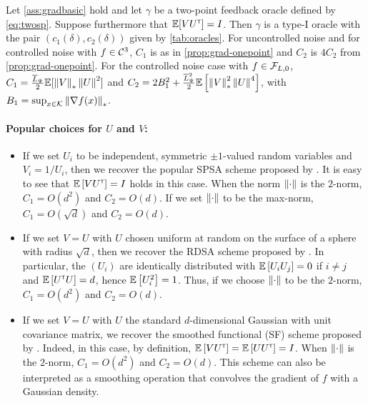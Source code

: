 \begin{proposition}
\label{prop:grad-spsa}
Let \cref{ass:gradbasic} hold and let $\gamma$  be a two-point feedback oracle defined by \eqref{eq:twosp}.
Suppose furthermore that $\mathbb{E}[V U^\mathsf{\scriptscriptstyle T}] = I$.
Then $\gamma$ is a type-I oracle with the pair $(c_1(\delta),c_2(\delta))$ 
given by \cref{tab:oracles}. For uncontrolled noise and for controlled noise with $f\in\mathcal{C}^3$, $C_1$ is as in \cref{prop:grad-onepoint} and $C_2$ is $4 C_2$ from \cref{prop:grad-onepoint}. For the controlled noise case with $f \in \mathcal{F}_{L,0}$,
$C_1 = \frac{\overline{L}_{\Psi}}{2} \mathbb{E}[ \left\|V\right\|_* \left\|U\right\|^2]$  
and
$C_2 =  2 B_1^2  + \frac{ \overline{L}_{\Psi}^2}{2}\mathbb{E}\left[ \left\|V\right\|_*^2 \left\|U\right\|^4 \right]$, with $B_1 = \sup_{x\in \mathcal{K}} \left\|\nabla f(x)\right\|_*$.
\end{proposition}

\paragraph{Popular choices for $U$ and $V$:}
\begin{itemize}
 \item If we set $U_i$ to be independent, symmetric $\pm 1$-valued random variables and $V_i = 1/U_i$, then we recover the popular SPSA scheme proposed by \citet{spall1992multivariate}.
It is easy to see that $\mathbb{E}\left[  V U^\mathsf{\scriptscriptstyle T} \right] = I$ holds in this case.
 When the norm $\left\|\cdot\right\|$ is the $2$-norm, $C_1 = O(d^2)$ and $C_2 = O(d)$. If we set $\left\|\cdot\right\|$ to be the max-norm, $C_1 = O(\sqrt{d})$ and $C_2 = O(d)$.
 \item If we set $V=U$ with $U$ chosen uniform at random on the surface of a sphere with radius $\sqrt{d}$,
 then we recover the RDSA scheme proposed by  \citet[pp.~58--60]{kushcla}.
 In particular, the $(U_i)$ are identically distributed with $\mathbb{E}\left[ U_i U_j \right] = 0$ if $i\ne j$ and $\mathbb{E}\left[ U^\mathsf{\scriptscriptstyle T} U \right] = d$, hence $\mathbb{E}\left[U_i^2\right] = 1$. Thus, if we choose $\left\|\cdot\right\|$ to be the $2$-norm, $C_1 = O( d^2 )$ and $C_2 = O(d)$.
 \item If we set $V=U$ with $U$ the standard $d$-dimensional Gaussian with unit covariance matrix, we recover the smoothed functional (SF) scheme proposed by \citet{katkul}.
Indeed, in this case, by definition, $\mathbb{E}\left[VU^\mathsf{\scriptscriptstyle T}\right] = \mathbb{E}\left[U U^\mathsf{\scriptscriptstyle T} \right] = I$.
When $\left\|\cdot\right\|$ is the $2$-norm, $C_1 = O(d^2)$
 and $C_2 = O( d)$.
 This scheme can also be interpreted as a smoothing operation that  convolves the gradient of  $f$ with a Gaussian density.
\end{itemize}


